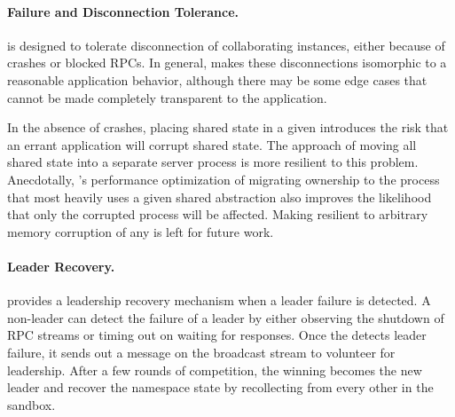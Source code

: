 
 

\paragraph{Failure and Disconnection Tolerance.}  
\graphene{} is designed to tolerate disconnection of collaborating \libos{} instances,
either because of crashes or blocked RPCs.  In general, \graphene{} makes 
these disconnections isomorphic to a reasonable application behavior,
although there may be some edge cases that cannot be made completely transparent to the application.

In the absence of crashes, placing shared state in a given \picoproc{} introduces the risk that an errant 
application will corrupt shared \libos{} state.  The \microkernel{} approach of 
moving all shared state into a separate server process is more resilient to this problem.
Anecdotally, \graphene{}'s performance optimization of migrating ownership to the process that 
most heavily uses a given shared abstraction also improves the likelihood that only the corrupted
process will be affected.  
Making \graphene{} resilient to arbitrary memory corruption of any \picoproc{} is left for future work.


\paragraph{Leader Recovery.}
\graphene{} provides a leadership recovery mechanism when a leader failure is detected.
A non-leader \picoproc{} can detect the failure of a leader by either observing the shutdown of RPC streams or timing out on waiting for responses. 
Once the \picoproc{} detects leader failure, it sends out a message on the broadcast stream to volunteer for leadership.
After a few rounds of competition, the winning \picoproc{} becomes the new leader and recover the namespace state by recollecting from every other \picoproc{} in the sandbox.

